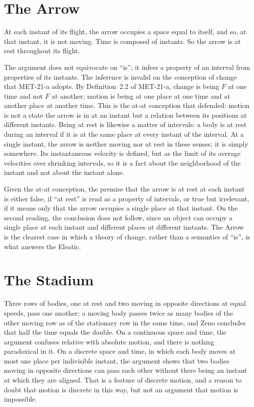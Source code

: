 \documentclass{situationist-preprint}
\begin{document}
\section{The Arrow}

At each instant of its flight, the arrow occupies a space equal to itself, and so, at that instant, it is not moving. Time is composed of instants. So the arrow is at rest throughout its flight.

The argument does not equivocate on \enquote{is}; it infers a property of an interval from properties of its instants. The inference is invalid on the conception of change that MET-21-a adopts. By Definition~2.2 of MET-21-a, change is being $F$ at one time and not $F$ at another; motion is being at one place at one time and at another place at another time. This is the at-at conception that \citet{Russell1903} defended: motion is not a state the arrow is in at an instant but a relation between its positions at different instants. Being at rest is likewise a matter of intervals: a body is at rest during an interval if it is at the same place at every instant of the interval. At a single instant, the arrow is neither moving nor at rest in these senses; it is simply somewhere. Its instantaneous velocity is defined, but as the limit of its average velocities over shrinking intervals, so it is a fact about the neighborhood of the instant and not about the instant alone.

Given the at-at conception, the premise that the arrow is at rest at each instant is either false, if \enquote{at rest} is read as a property of intervals, or true but irrelevant, if it means only that the arrow occupies a single place at that instant. On the second reading, the conclusion does not follow, since an object can occupy a single place at each instant and different places at different instants. The Arrow is the clearest case in which a theory of change, rather than a semantics of \enquote{is}, is what answers the Eleatic.

\section{The Stadium}

Three rows of bodies, one at rest and two moving in opposite directions at equal speeds, pass one another; a moving body passes twice as many bodies of the other moving row as of the stationary row in the same time, and Zeno concludes that half the time equals the double. On a continuous space and time, the argument confuses relative with absolute motion, and there is nothing paradoxical in it. On a discrete space and time, in which each body moves at most one place per indivisible instant, the argument shows that two bodies moving in opposite directions can pass each other without there being an instant at which they are aligned. That is a feature of discrete motion, and a reason to doubt that motion is discrete in this way, but not an argument that motion is impossible.
\end{document}
